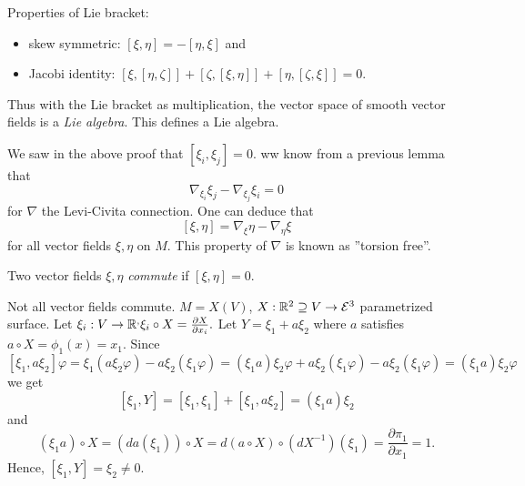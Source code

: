 \begin{remark}
	Properties of Lie bracket:
	\begin{itemize}
		\item skew symmetric: $ [\xi,\eta] = - [\eta,\xi] $ and
		\item Jacobi identity: $ [\xi, [\eta,\zeta]] + [\zeta,[\xi,\eta]] + [\eta,[\zeta,\xi]] = 0 $.
	\end{itemize}
\end{remark}

\begin{definition}
	Thus with the Lie bracket as multiplication, the vector space of smooth vector fields is a \emph{Lie algebra}. This defines a Lie algebra.
\end{definition}

\begin{remark}
	We saw in the above proof that $[\xi_i,\xi_j]=0$. ww know from a previous lemma that
	\[ \nabla_{\xi_i} \xi_j - \nabla_{\xi_j}\xi_i = 0 \]
	for $\nabla$ the Levi-Civita connection. One can deduce that
	\[ [\xi,\eta] = \nabla_\xi \eta - \nabla_\eta \xi  \] 
	for all vector fields $\xi,\eta$ on $M$. This property of $\nabla$ is known as ''torsion free''.
\end{remark}

\begin{definition}
	
	Two vector fields $ \xi, \eta $ \emph{commute} if $ [\xi,\eta] = 0 $.
	
\end{definition}

\begin{example}
	Not all vector fields commute. $ M = X(V) $, $ X: \mathbb R^2 \supseteq V \rightarrow \mathcal E^3 $ parametrized surface. Let $ \xi_i:V \rightarrow \mathbb R^, \xi_i\circ X = \frac{\partial X}{\partial x_i}. $ Let $ Y = \xi_1 + a\xi_2 $ where $ a $ satisfies $ a\circ X = \phi_1(x) = x_1 $. Since 
		\[ [\xi_1, a\xi_2]\varphi
		= \xi_1(a\xi_2 \varphi)- a\xi_2(\xi_1\varphi)
		= (\xi_1 a)\xi_2\varphi + a\xi_2(\xi_1\varphi) - a\xi_2(\xi_1\varphi)
		= (\xi_1 a)\xi_2\varphi \]
	we get 
		\[ [\xi_1,Y] = [\xi_1,\xi_1] + [\xi_1,a\xi_2] = (\xi_1a)\xi_2 \]
	and 
		\[ (\xi_1 a) \circ X = (da(\xi_1))\circ X = d(a \circ X) \circ (dX^{-1})(\xi_1) = \frac {\partial \pi_1}{\partial x_1} = 1.   \]
	Hence, $ [\xi_1,Y] = \xi_2 \neq 0 $.
\end{example}